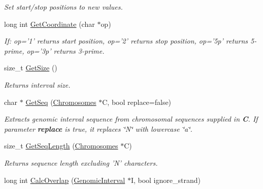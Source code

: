 \begin{DoxyCompactItemize}
\begin{DoxyCompactList}\small\item\em Set start/stop positions to new values. \end{DoxyCompactList}\item 
\hypertarget{classGenomicInterval_ae068e54e894fb239b61ec6d29e5f70bf}{
long int \hyperlink{classGenomicInterval_ae068e54e894fb239b61ec6d29e5f70bf}{GetCoordinate} (char $\ast$op)}
\label{classGenomicInterval_ae068e54e894fb239b61ec6d29e5f70bf}

\begin{DoxyCompactList}\small\item\em If: op='1' returns start position, op='2' returns stop position, op='5p' returns 5-\/prime, op='3p' returns 3-\/prime. \end{DoxyCompactList}\item 
\hypertarget{classGenomicInterval_a7ceb36d952453db9473c7548c885f40a}{
size\_\-t \hyperlink{classGenomicInterval_a7ceb36d952453db9473c7548c885f40a}{GetSize} ()}
\label{classGenomicInterval_a7ceb36d952453db9473c7548c885f40a}

\begin{DoxyCompactList}\small\item\em Returns interval size. \end{DoxyCompactList}\item 
\hypertarget{classGenomicInterval_aff25b35226220508539b1183d5b9c11d}{
char $\ast$ \hyperlink{classGenomicInterval_aff25b35226220508539b1183d5b9c11d}{GetSeq} (\hyperlink{classChromosomes}{Chromosomes} $\ast$C, bool replace=false)}
\label{classGenomicInterval_aff25b35226220508539b1183d5b9c11d}

\begin{DoxyCompactList}\small\item\em Extracts genomic interval sequence from chromosomal sequences supplied in {\bfseries C}. If parameter {\bfseries replace} is true, it replaces \char`\"{}N\char`\"{} with lowercase \char`\"{}a\char`\"{}. \end{DoxyCompactList}\item 
\hypertarget{classGenomicInterval_a39cd65d08a0c64a8bbddec32c8decbd3}{
size\_\-t \hyperlink{classGenomicInterval_a39cd65d08a0c64a8bbddec32c8decbd3}{GetSeqLength} (\hyperlink{classChromosomes}{Chromosomes} $\ast$C)}
\label{classGenomicInterval_a39cd65d08a0c64a8bbddec32c8decbd3}

\begin{DoxyCompactList}\small\item\em Returns sequence length excluding 'N' characters. \end{DoxyCompactList}\item 
\hypertarget{classGenomicInterval_aea112f495d21eda675de671d9ff2e5ad}{
long int \hyperlink{classGenomicInterval_aea112f495d21eda675de671d9ff2e5ad}{CalcOverlap} (\hyperlink{classGenomicInterval}{GenomicInterval} $\ast$I, bool ignore\_\-strand)}
\label{classGenomicInterval_aea112f495d21eda675de671d9ff2e5ad}


\end{DoxyCompactItemize}
